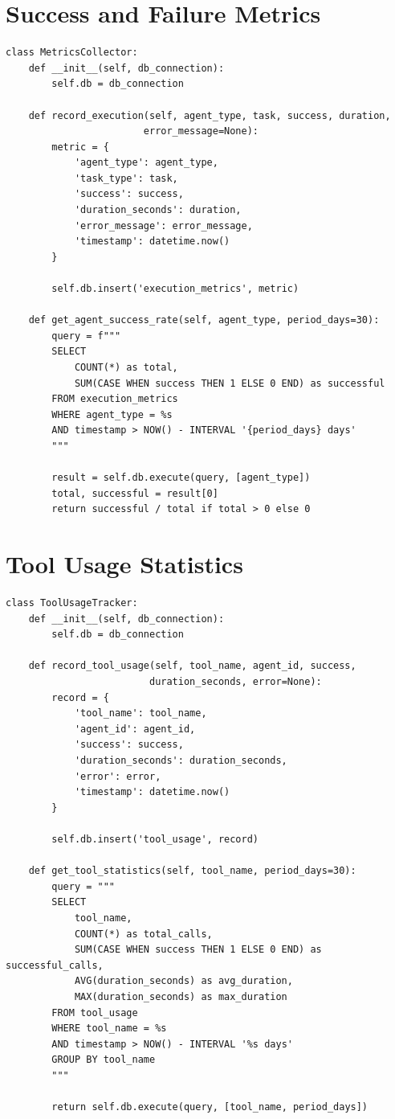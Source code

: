 \documentclass{report}
\begin{document}
\section{Success and Failure Metrics}

\begin{lstlisting}
class MetricsCollector:
    def __init__(self, db_connection):
        self.db = db_connection
    
    def record_execution(self, agent_type, task, success, duration, 
                        error_message=None):
        metric = {
            'agent_type': agent_type,
            'task_type': task,
            'success': success,
            'duration_seconds': duration,
            'error_message': error_message,
            'timestamp': datetime.now()
        }
        
        self.db.insert('execution_metrics', metric)
    
    def get_agent_success_rate(self, agent_type, period_days=30):
        query = f"""
        SELECT 
            COUNT(*) as total,
            SUM(CASE WHEN success THEN 1 ELSE 0 END) as successful
        FROM execution_metrics
        WHERE agent_type = %s 
        AND timestamp > NOW() - INTERVAL '{period_days} days'
        """
        
        result = self.db.execute(query, [agent_type])
        total, successful = result[0]
        return successful / total if total > 0 else 0
\end{lstlisting}

\section{Tool Usage Statistics}

\begin{lstlisting}
class ToolUsageTracker:
    def __init__(self, db_connection):
        self.db = db_connection
    
    def record_tool_usage(self, tool_name, agent_id, success, 
                         duration_seconds, error=None):
        record = {
            'tool_name': tool_name,
            'agent_id': agent_id,
            'success': success,
            'duration_seconds': duration_seconds,
            'error': error,
            'timestamp': datetime.now()
        }
        
        self.db.insert('tool_usage', record)
    
    def get_tool_statistics(self, tool_name, period_days=30):
        query = """
        SELECT 
            tool_name,
            COUNT(*) as total_calls,
            SUM(CASE WHEN success THEN 1 ELSE 0 END) as successful_calls,
            AVG(duration_seconds) as avg_duration,
            MAX(duration_seconds) as max_duration
        FROM tool_usage
        WHERE tool_name = %s 
        AND timestamp > NOW() - INTERVAL '%s days'
        GROUP BY tool_name
        """
        
        return self.db.execute(query, [tool_name, period_days])
\end{lstlisting}
\end{document}
